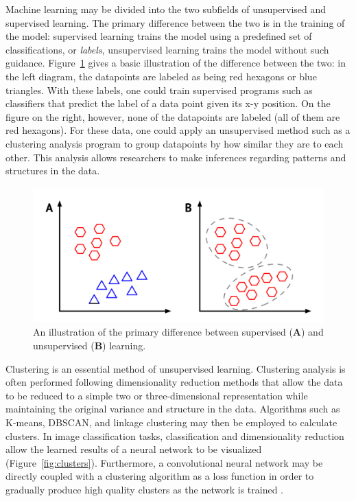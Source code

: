 \documentclass[12pt,oneside,onecolumn,a4paper]{article}
\begin{document}
Machine learning may be divided into the two subfields of unsupervised and supervised learning. The primary difference between the two is in the training of the model: supervised learning trains the model using a predefined set of classifications, or \textit{labels}, unsupervised learning trains the model without such guidance. Figure~\ref{fig:super} gives a basic illustration of the difference between the two:
in the left diagram, the datapoints are labeled as being red hexagons or blue triangles. With these labels, one could train supervised programs such as classifiers that predict the label of a data point given its x-y position. On the figure on the right, however, none of the datapoints are labeled (all of them are red hexagons). For these data, one could apply an unsupervised method such as a clustering analysis program to group datapoints by how similar they are to each other. This analysis allows researchers to make inferences regarding patterns and structures in the data.

\begin{figure}[H]
\begin{center}
\includegraphics[width=0.8\columnwidth]{figures/learningtypes}
\caption{An illustration of the primary difference between supervised (\textbf{A}) and unsupervised (\textbf{B}) learning.\label{fig:super}
}
\end{center}
\end{figure}

Clustering is an essential method of unsupervised learning. Clustering analysis is often performed following dimensionality reduction methods that allow the data to be reduced to a simple two or three-dimensional representation while maintaining the original variance and structure in the data. Algorithms such as K-means, DBSCAN, and linkage clustering may then be employed to calculate clusters. In image classification tasks, classification and dimensionality reduction allow the learned results of a neural network to be visualized (Figure~\ref{fig:clusters}). Furthermore, a convolutional neural network may be directly coupled with a clustering algorithm as a loss function in order to gradually produce high quality clusters as the network is trained \citep{yangCVPR2016joint}.
\end{document}

